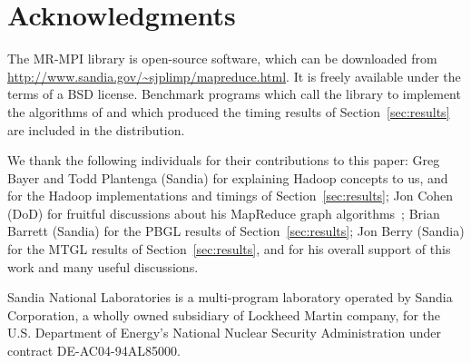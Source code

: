\section{Acknowledgments}
\label{sec:thanks}

The MR-MPI library is open-source software, which can be downloaded
from \url{http://www.sandia.gov/~sjplimp/mapreduce.html}.  It is
freely available under the terms of a BSD license.  Benchmark programs
which call the library to implement the algorithms of and which
produced the timing results of Section~\ref{sec:results} are included
in the distribution.

We thank the following individuals for their contributions to this
paper: Greg Bayer and Todd Plantenga (Sandia) for explaining Hadoop
concepts to us, and for the Hadoop implementations and timings of
Section~\ref{sec:results}; Jon Cohen (DoD) for fruitful discussions
about his MapReduce graph algorithms~\cite{Cohen09}; Brian Barrett
(Sandia) for the PBGL results of Section~\ref{sec:results}; Jon Berry
(Sandia) for the MTGL results of Section~\ref{sec:results}, and for
his overall support of this work and many useful discussions.

Sandia National Laboratories is a multi-program laboratory operated by
Sandia Corporation, a wholly owned subsidiary of Lockheed Martin
company, for the U.S. Department of Energy's National Nuclear Security
Administration under contract DE-AC04-94AL85000.
